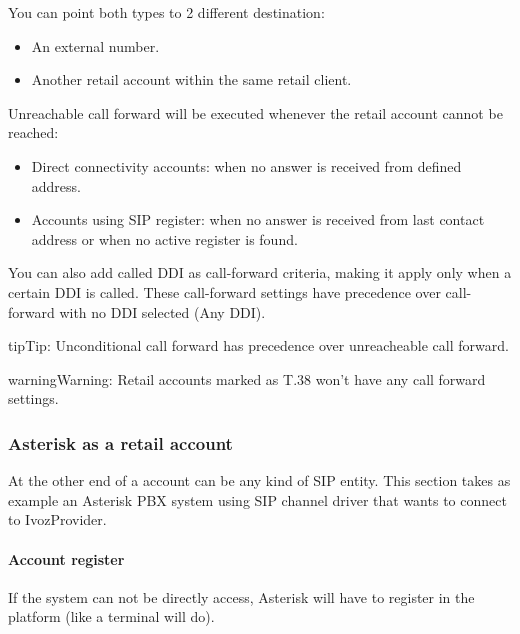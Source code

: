 \documentclass[letterpaper,10pt,english]{sphinxmanual}
\begin{document}
You can point both types to 2 different destination:
\begin{itemize}
\item {} 
An external number.

\item {} 
Another retail account within the same retail client.

\end{itemize}

Unreachable call forward will be executed whenever the retail account cannot be reached:
\begin{itemize}
\item {} 
Direct connectivity accounts: when no answer is received from defined address.

\item {} 
Accounts using SIP register: when no answer is received from last contact address or when no active register is found.

\end{itemize}

You can also add called DDI as call-forward criteria, making it apply only when a certain DDI is called. These call-forward
settings have precedence over call-forward with no DDI selected (Any DDI).

\begin{notice}{tip}{Tip:}
Unconditional call forward has precedence over unreacheable call forward.
\end{notice}

\begin{notice}{warning}{Warning:}
Retail accounts marked as T.38 won't have any call forward settings.
\end{notice}


\subsubsection{Asterisk as a retail account}
\label{administration_portal/client/retail/retail_accounts:asterisk-as-a-retail-account}
At the other end of a account can be any kind of SIP entity. This section takes
as example an Asterisk PBX system using SIP channel driver that wants to connect
to IvozProvider.


\paragraph{Account register}
\label{administration_portal/client/retail/retail_accounts:account-register}
If the system can not be directly access, Asterisk will have to register in the
platform (like a terminal will do).
\end{document}
